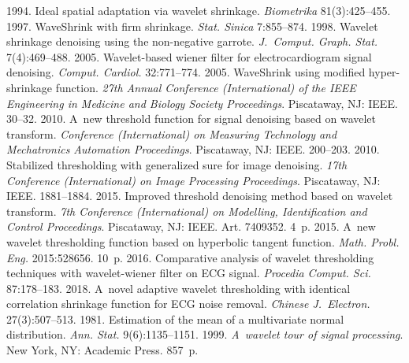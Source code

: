 \begin{multicols}{2}
{\small\frenchspacing
 {%
 \begin{thebibliography}{99}
 1994. Ideal spatial adaptation via wavelet shrinkage. \textit{Biometrika} 81(3):425--455.
 1997. WaveShrink with firm shrinkage. \textit{Stat. Sinica} 7:855--874.
 1998. Wavelet shrinkage denoising using the non-negative garrote. \textit{J.~Comput. Graph. Stat.} 7(4):469--488.
 2005. Wavelet-based wiener filter for electrocardiogram signal denoising. \textit{Comput. Cardiol.} 32:771--774.
 2005. 
WaveShrink using modified hyper-shrinkage function. 
\textit{27th Annual Conference (International) of the IEEE Engineering in Medicine and Biology Society Proceedings}. Piscataway, NJ: IEEE. 30--32.
 2010. A~new threshold function for signal denoising based on wavelet transform. 
\textit{Conference (International) on Measuring Technology and Mechatronics Automation Proceedings}. Piscataway, NJ: IEEE. 200--203.
 2010. Stabilized thresholding with generalized sure for image denoising. 
\textit{17th Conference (International) on Image Processing Proceedings}. Piscataway, NJ: IEEE. 1881--1884.
 2015. Improved threshold denoising method based on wavelet transform. 
\textit{7th Conference (International) on Modelling, Identification and Control Proceedings}. Piscataway, NJ: IEEE. Art. 7409352. 4~p.
 2015. A~new wavelet thresholding function based on hyperbolic tangent function. 
\textit{Math. Probl. Eng.} 2015:528656. 10~p.
 2016. Comparative analysis of wavelet thresholding techniques with wavelet-wiener filter on ECG signal. 
\textit{Procedia Comput. Sci.} 87:178--183.
 2018. A~novel adaptive wavelet thresholding with identical correlation shrinkage function for ECG noise removal. 
\textit{Chinese J.~Electron.} 27(3):507--513.
 1981. Estimation of the mean of a multivariate normal distribution. \textit{Ann. Stat.} 9(6):1135--1151.
 1999. \textit{A~wavelet tour of signal processing}. New York, NY: Academic Press. 857~p.

\end{thebibliography}}}
\end{multicols}
